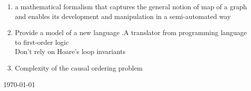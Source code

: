 \documentclass[a4paper,12pt]{article}
\begin{document}
\begin{enumerate}
	\item a  mathematical  formalism  that  captures  the  general  notion  of  map  of  a  graph  and  enables  its  development  and  manipulation  in  a  semi-automated  way\cite{Fionda_Building_2016}
	
	\item Provide a model of a new language .A translator from programming language to first-order logic\cite{Lin_A_2016}	
	\\Don't rely on Hoare’s  loop  invariants

	\item Complexity of the causal ordering problem\cite{Gonalves_A_2016}

\cite{Balasubramanian_Smooth_2016}
\cite{Balyo_SAT_2016}
\cite{Veksler_Learning_2016}
\cite{Girldez-Cru_Generating_2016}
\cite{Bischl_ASlib_2016}
\cite{Cabalar_A_2016}



\cite{Bevern_H_2016}
\cite{Bastiaanse_Making_2016}
\cite{Marcinkiewcz_Serotonin_2016}
 
 




\end{enumerate}
\today




\end{document}
